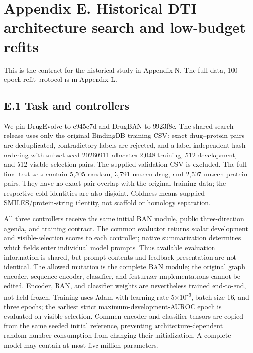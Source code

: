 \section*{Appendix E. Historical DTI architecture search and low-budget refits}
This is the contract for the historical study in Appendix N. The full-data, 100-epoch refit protocol is in Appendix L.

\subsection*{E.1 Task and controllers}
We pin DrugEvolve to e945c7d and DrugBAN to 9923f8c. The shared search release uses only the original BindingDB training CSV: exact drug--protein pairs are deduplicated, contradictory labels are rejected, and a label-independent hash ordering with subset seed 20260911 allocates 2,048 training, 512 development, and 512 visible-selection pairs. The supplied validation CSV is excluded. The full final test sets contain 5,505 random, 3,791 unseen-drug, and 2,507 unseen-protein pairs. They have no exact pair overlap with the original training data; the respective cold identities are also disjoint. Coldness means supplied SMILES/protein-string identity, not scaffold or homology separation.

All three controllers receive the same initial BAN module, public three-direction agenda, and training contract. The common evaluator returns scalar development and visible-selection scores to each controller; native summarization determines which fields enter individual model prompts. Thus available evaluation information is shared, but prompt contents and feedback presentation are not identical. The allowed mutation is the complete BAN module; the original graph encoder, sequence encoder, classifier, and featurizer implementations cannot be edited. Encoder, BAN, and classifier weights are nevertheless trained end-to-end, not held frozen. Training uses Adam with learning rate 5\(\times\)10\textsuperscript{-5}, batch size 16, and three epochs; the earliest strict maximum-development-AUROC epoch is evaluated on visible selection. Common encoder and classifier tensors are copied from the same seeded initial reference, preventing architecture-dependent random-number consumption from changing their initialization. A complete model may contain at most five million parameters.

